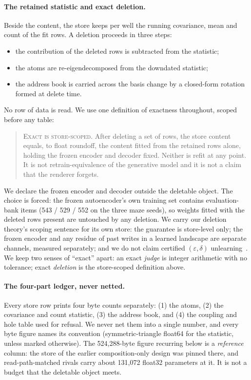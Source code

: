 \documentclass{article} %
\begin{document}
\paragraph{The retained statistic and exact deletion.} Beside the content, the store keeps per well the running covariance, mean and count of the fit rows. A deletion proceeds in
three steps:
\begin{itemize}[leftmargin=*,nosep]
\item the contribution of the deleted rows is subtracted from the statistic;
\item the atoms are re-eigendecomposed from the downdated statistic;
\item the address book is carried across the basis change by a closed-form rotation formed at
  delete time.
\end{itemize}
No row of data is read. We use one definition of exactness throughout, scoped before any table:

\begin{quote}\small
\textsc{Exact is store-scoped.} After deleting a set of rows, the store content equals, to
float roundoff, the content fitted from the retained rows alone, holding the frozen encoder and
decoder fixed. Neither is refit at any point. It is not retrain-equivalence of the generative
model and it is not a claim that the renderer forgets.
\end{quote}

\noindent We declare the frozen encoder and decoder outside the deletable object. The choice
is forced: the frozen autoencoder's own training set contains evaluation-bank items
(543 / 529 / 552 on the three maze seeds), so weights fitted with the deleted rows present are untouched by any deletion. %
We carry our deletion theory's scoping sentence for its own store: the guarantee
is store-level only; the frozen encoder and any residue of past writes in a learned
landscape are separate channels, measured separately; and we do not claim certified
$(\varepsilon,\delta)$ unlearning~\citep{guo2020certified}. %
We keep two senses of ``exact'' apart: an exact \emph{judge} is integer arithmetic with no
tolerance; exact \emph{deletion} is the store-scoped definition above.

\paragraph{The four-part ledger, never netted.} Every store row prints four byte counts
separately: (1) the atoms, (2) the covariance and count statistic, (3) the address book, and
(4) the coupling and hole table used for refusal.
We never net them into a single number, and every byte figure names its convention
(symmetric-triangle float64 for the statistic, unless marked otherwise). The 524,288-byte figure
recurring below is a \emph{reference} column: the store of the earlier composition-only design
was pinned there, and read-path-matched rivals carry about 131,072 float32 parameters at it. %
It is not a budget that the deletable object meets.
\end{document}
